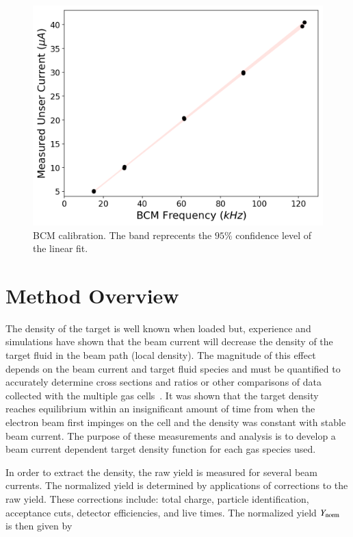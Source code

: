 \documentclass[final,5p,times,twocolumn]{elsarticle}
\begin{document}
\begin{figure}[!h]
      \centering
    \includegraphics[width=\linewidth]{images/dnew_calibration.pdf}
    \caption{BCM calibration. The band reprecents the $95\%$ confidence level of the linear fit.}
    \label{fig:dnew_cal}
\end{figure}


\section{Method Overview}

The density of the target is well known when loaded but, experience and simulations have shown that the beam current will 
decrease the density of the target fluid in the beam path (local density). The magnitude of this effect depends on the 
beam current and target fluid species and must be quantified to accurately determine cross sections and ratios or 
other comparisons of data collected with the multiple gas cells~\cite{celldes}. 
It was shown that the target density reaches equilibrium within an insignificant amount of time from when the 
electron beam first impinges on the cell and the density was constant with stable beam current. The purpose of 
these measurements and analysis is to develop a beam current dependent target density function for each gas species used.  

In order to extract the density, the raw yield is measured for several beam currents. The normalized yield is 
determined by applications of corrections  to the raw yield. These corrections include: total charge, 
particle identification, acceptance cuts, detector efficiencies, and live times. The normalized yield $Y_{\rm{norm}}$ is then given by
\end{document}
